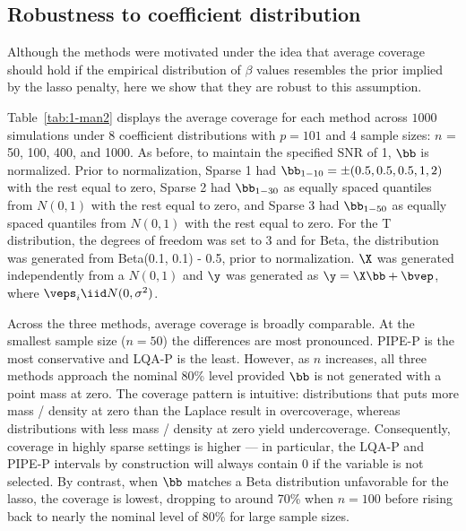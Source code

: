 \subsection{Robustness to coefficient distribution}\label{Sec:Distributions}

Although the methods were motivated under the idea that average coverage should hold if the empirical distribution of $\beta$ values resembles the prior implied by the lasso penalty, here we show that they are robust to this assumption.

Table~\ref{tab:1-man2} displays the average coverage for each method across $1000$ simulations under 8 coefficient distributions with $p = 101$ and 4 sample sizes: $n$ = 50, 100, 400, and 1000. As before, to maintain the specified SNR of 1, $\bb$ is normalized. Prior to normalization, Sparse 1 had $\bb_{1-10} = \pm(0.5, 0.5, 0.5, 1, 2)$ with the rest equal to zero, Sparse 2 had $\bb_{1-30}$ as equally spaced quantiles from $N(0, 1)$ with the rest equal to zero, and Sparse 3 had $\bb_{1-50}$ as equally spaced quantiles from $N(0, 1)$ with the rest equal to zero. For the T distribution, the degrees of freedom was set to 3 and for Beta, the distribution was generated from Beta(0.1, 0.1) - 0.5, prior to normalization. $\X$ was generated independently from a $N(0, 1)$ and $\y$ was generated as $\y = \X\bb + \bvep$, where $\veps_i \iid N(0, \sigma^2)$.

\begin{table}[hbt!]
    \centering
    
    \caption{\label{tab:1-man2} Average coverages from the simulation described in Section~\ref{Sec:Distributions}. The nominal coverage rate is 80\%. The first column of the table gives a depiction of the respective distributions.}
\end{table}

Across the three methods, average coverage is broadly comparable. At the smallest sample size ($n = 50$) the differences are most pronounced. PIPE-P is the most conservative and LQA-P is the least. However, as $n$ increases, all three methods approach the nominal 80\% level provided $\bb$ is not generated with a point mass at zero. The coverage pattern is intuitive: distributions that puts more mass / density at zero than the Laplace result in overcoverage, whereas distributions with less mass / density at zero yield undercoverage. Consequently, coverage in highly sparse settings is higher --- in particular, the LQA-P and PIPE-P intervals by construction will always contain $0$ if the variable is not selected. By contrast, when $\bb$ matches a Beta distribution unfavorable for the lasso, the coverage is lowest, dropping to around 70\% when $n = 100$ before rising back to nearly the nominal level of 80\% for large sample sizes.

